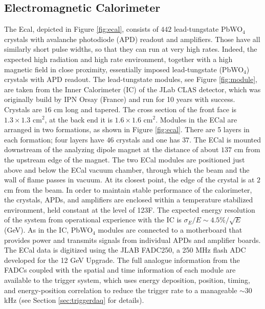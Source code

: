 \subsection{Electromagnetic Calorimeter} 
\label{sec:ecal}

The Ecal, depicted in Figure \ref{fig:ecal}, consists of $442$ lead-tungstate PbWO$_4$ crystals with avalanche photodiode (APD) readout and amplifiers. Those have all similarly short pulse widths, so that they can run at very high rates. Indeed, the expected high radiation and high rate environment, together with a high magnetic field in close proximity, essentially imposed lead-tungstate (PbWO$_4$) crystals with APD readout. The lead-tungstate modules, see Figure \ref{fig:module}, are taken from the Inner Calorimeter (IC) of the JLab CLAS detector, which was originally build by IPN Orsay (France) and run for 10 years with success. Crystals are $16$ cm long and tapered. The cross section of the front face is $1.3\times 1.3$ cm$^2$, at the back end it is $1.6\times 1.6$ cm$^2$. Modules in the ECal are arranged in two formations, as shown in Figure \ref{fig:ecal}. There are 5 layers in each formation; four layers have $46$ crystals and one has $37$. The ECal is mounted downstream of the analyzing dipole magnet at the distance of about $137$ cm from the upstream edge of the magnet. The two ECal modules are positioned just above and below the ECal vacuum chamber, through which the beam and the wall of flame passes in vacuum. At its closest point, the edge of the crystal is at $2$ cm from the beam. In order to maintain stable performance of the calorimeter, the crystals, APDs, and amplifiers are enclosed within a temperature stabilized environment, held constant at the level of 1\!\char23F. The expected energy resolution of the system from operational experience with the IC is $\sigma_E/E \sim 4.5\%/\sqrt{E}$ (GeV). As in the IC, PbWO$_4$ modules are connected to a motherboard that provides power and transmits signals from individual APDs and amplifier boards. The ECal data is digitized using the JLAB FADC250, a 250 MHz flash ADC developed for the 12 GeV Upgrade. The full analogue information from the FADCs coupled with the spatial and time information of each module are available to the trigger system, which uses energy deposition, position, timing, and energy-position correlation to reduce the trigger rate to a manageable $\sim 30$ kHz (see Section \ref{sec:triggerdaq} for details).

